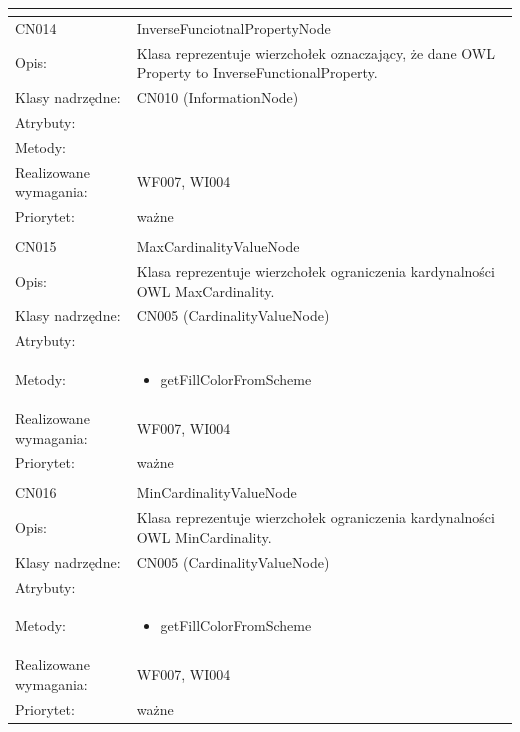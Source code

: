 \documentclass[a4paper,10pt]{article}
\begin{document}
\begin{center}
\begin{longtable}{|m{3cm}|m{9cm}|}
\multicolumn{2}{c}{} \\
 \hline

CN014 & InverseFunciotnalPropertyNode \\ \hline
Opis: & Klasa reprezentuje wierzchołek oznaczający, że dane OWL Property to InverseFunctionalProperty.    \\ \hline
Klasy nadrzędne: & CN010 (InformationNode)     \\ \hline
Atrybuty: & %
 \\ \hline
Metody: & %
  \\ \hline
Realizowane wymagania: & WF007, WI004 \\ \hline
Priorytet: & ważne  \\ \hline

\multicolumn{2}{c}{} \\
 \hline

CN015 & MaxCardinalityValueNode \\ \hline
Opis: & Klasa reprezentuje wierzchołek ograniczenia kardynalności OWL MaxCardinality.    \\ \hline
Klasy nadrzędne: & CN005 (CardinalityValueNode)     \\ \hline
Atrybuty: & %
 \\ \hline
Metody: & \begin{itemize}
 \item getFillColorFromScheme
\end{itemize}
  \\ \hline
Realizowane wymagania: & WF007, WI004 \\ \hline
Priorytet: & ważne  \\ \hline

\multicolumn{2}{c}{} \\
 \hline

CN016 & MinCardinalityValueNode \\ \hline
Opis: & Klasa reprezentuje wierzchołek ograniczenia kardynalności OWL MinCardinality.    \\ \hline
Klasy nadrzędne: & CN005 (CardinalityValueNode)     \\ \hline
Atrybuty: & %
 \\ \hline
Metody: & \begin{itemize}
 \item getFillColorFromScheme
\end{itemize}
  \\ \hline
Realizowane wymagania: & WF007, WI004 \\ \hline
Priorytet: & ważne  \\ \hline


\end{longtable}
\end{center}
\end{document}
